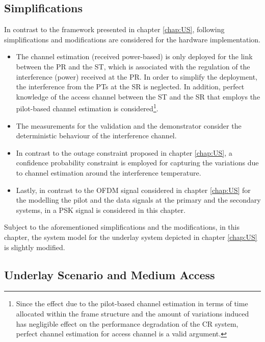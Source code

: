 \subsection{Simplifications}
\label{ssec:simp1}
In contrast to the framework presented in chapter \ref{chap:US}, following simplifications and modifications are considered for the hardware implementation.
\begin{itemize}
\item The channel estimation (received power-based) is only deployed for the link between the PR and the ST, which is associated with the regulation of the interference (power) received at the PR. In order to simplify the deployment, the interference from the PTs at the SR is neglected. In addition, perfect knowledge of the access channel between the ST and the SR that employs the pilot-based channel estimation is considered\footnote{Since the effect due to the pilot-based channel estimation in terms of time allocated within the frame structure and the amount of variations induced has negligible effect on the performance degradation of the CR system, perfect channel estimation for access channel is a valid argument.}.  
\item The measurements for the validation and the demonstrator consider the deterministic behaviour of the interference channel.  
\item In contrast to the outage constraint proposed in chapter \ref{chap:US}, a confidence probability constraint is employed for capturing the variations due to channel estimation around the interference temperature. %
\item Lastly, in contrast to the OFDM signal considered in chapter \ref{chap:US} for the modelling the pilot and the data signals at the primary and the secondary systems, in a PSK signal is considered in this chapter. 
\end{itemize}

Subject to the aforementioned simplifications and the modifications, in this chapter, the system model for the underlay system depicted in chapter \ref{chap:US} is slightly modified. 

\subsection{Underlay Scenario and Medium Access}
\label{scenario}

